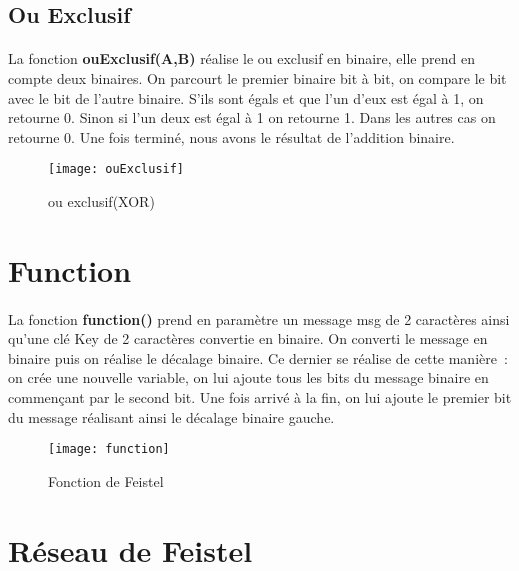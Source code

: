 \documentclass[11pt,fleqn]{book} %
\begin{document}

\subsection{Ou Exclusif}

\paragraph{}La fonction \textbf{ouExclusif(A,B)} réalise le ou exclusif en binaire, elle prend en compte deux binaires.
\vspace{0.5cm}On parcourt le premier binaire bit à bit, on compare le bit avec le bit de l'autre binaire. S'ils sont égals et que l'un d'eux est égal à 1, on retourne 0. Sinon si l'un deux est égal à 1 on retourne 1. Dans les autres cas on retourne 0. Une fois terminé, nous avons le résultat de l'addition binaire.

\begin{figure}[!h]
\centering\texttt{[image: ouExclusif]}
\caption{ou exclusif(XOR)}
\end{figure}


\section{Function}

\paragraph{}La fonction \textbf{function()} prend en paramètre un message msg de 2 caractères ainsi qu'une clé Key de 2 caractères convertie en binaire. On converti le message en binaire puis on réalise le décalage binaire. Ce dernier se réalise de cette manière : on crée une nouvelle variable, on lui ajoute tous les bits du message binaire en commençant par le second bit. Une fois arrivé à la fin, on lui ajoute le premier bit du message réalisant ainsi le décalage binaire gauche.

\begin{figure}[!h]
\centering\texttt{[image: function]}
\caption{Fonction de Feistel}
\end{figure}


\section{Réseau de Feistel}
\end{document}
